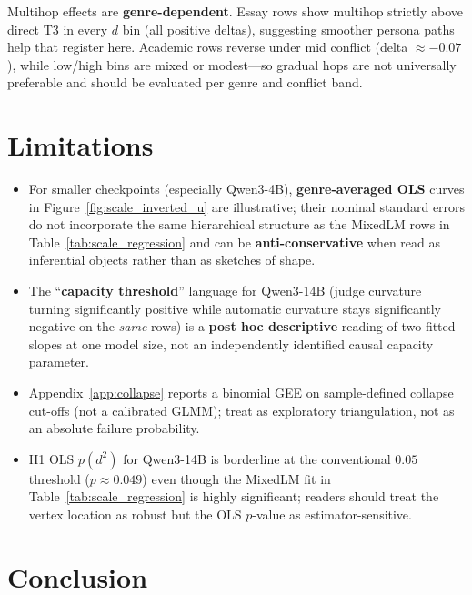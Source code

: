 \documentclass[sigconf,nonacm]{acmart}
\begin{document}
Multihop effects are \textbf{genre-dependent}. Essay rows show multihop strictly above direct T3 in every $d$ bin (all positive deltas), suggesting smoother persona paths help that register here. Academic rows reverse under mid conflict (delta ${\approx}{-}0.07$), while low/high bins are mixed or modest---so gradual hops are not universally preferable and should be evaluated per genre and conflict band.

\section{Limitations}

\begin{itemize}\itemsep2pt
\item For smaller checkpoints (especially Qwen3-4B), \textbf{genre-averaged OLS} curves in Figure~\ref{fig:scale_inverted_u} are illustrative; their nominal standard errors do not incorporate the same hierarchical structure as the MixedLM rows in Table~\ref{tab:scale_regression} and can be \textbf{anti-conservative} when read as inferential objects rather than as sketches of shape.
\item The ``\textbf{capacity threshold}'' language for Qwen3-14B (judge curvature turning significantly positive while automatic curvature stays significantly negative on the \emph{same} rows) is a \textbf{post hoc descriptive} reading of two fitted slopes at one model size, not an independently identified causal capacity parameter.
\item Appendix~\ref{app:collapse} reports a binomial GEE on sample-defined collapse cut-offs (not a calibrated GLMM); treat as exploratory triangulation, not as an absolute failure probability.
\item H1 OLS $p(d^2)$ for Qwen3-14B is borderline at the conventional $0.05$ threshold ($p{\approx}0.049$) even though the MixedLM fit in Table~\ref{tab:scale_regression} is highly significant; readers should treat the vertex location as robust but the OLS $p$-value as estimator-sensitive.
\end{itemize}

\section{Conclusion}
\end{document}
